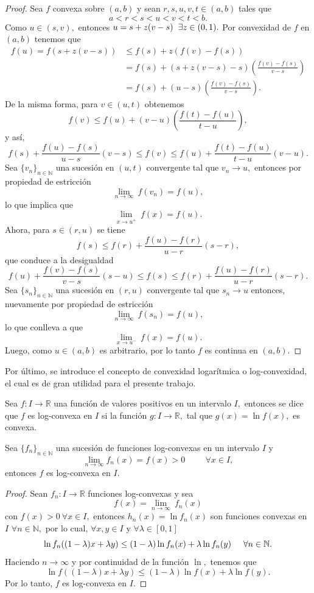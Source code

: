 \begin{proof}
	Sea $f$ convexa sobre $(a,b)$ y sean $r, s, u, v, t \in (a,b)$ tales que $$a < r < s < u < v < t < b.$$ Como $u \in (s,v),$ entonces $u = s+z(v-s)  \hspace{0.2cm} \exists z \in (0,1).$ Por convexidad de $f$ en $(a,b)$ tenemos que
	\begin{align*}
	f(u) = f(s+z(v-s)) &\leq f(s)+z(f(v)-f(s))\\
	&= f(s)+(s+z(v-s)-s)\left(\frac{f(v)-f(s)}{v-s}\right)\\
	&=f(s)+(u-s)\left(\frac{f(v)-f(s)}{v-s}\right).
	\end{align*}
	De la misma forma, para $v \in (u,t)$ obtenemos $$f(v) \leq f(u)+(v-u)\left(\frac{f(t)-f(u)}{t-u}\right),$$ y así, $$f(s)+\frac{f(u)-f(s)}{u-s}(v-s) \leq f(v) \leq f(u)+\frac{f(t)-f(u)}{t-u}(v-u).$$
	Sea $\{v_n\}_{n \in \mathbb{N}}$ una sucesión en $(u,t)$ convergente tal que $v_n \rightarrow u,$ entonces por propiedad de estricción $$\lim_{n \rightarrow \infty}\ f(v_n) = f(u),$$ lo que implica que $$\lim_{x \rightarrow u^+}\ f(x) = f(u).$$ Ahora, para $s \in (r,u)$ se tiene $$f(s) \leq f(r)+\frac{f(u)-f(r)}{u-r}(s-r),$$ que conduce a la desigualdad $$f(u)+\frac{f(v)-f(s)}{v-s}(s-u) \leq f(s) \leq f(r)+\frac{f(u)-f(r)}{u-r}(s-r).$$
	Sea $\{s_n\}_{n \in \mathbb{N}}$ una sucesión en $(r,u)$ convergente tal que $s_n \rightarrow u$ entonces, nuevamente por propiedad de estricción $$\lim_{n \rightarrow \infty}\ f(s_n) = f(u),$$ lo que conlleva a que $$\lim_{x \rightarrow u^-}\ f(x) = f(u).$$ Luego, como $u \in (a,b)$ es arbitrario, por lo tanto $f$ es continua en $(a,b).$
\end{proof}
Por último, se introduce el concepto de convexidad logarítmica o log-convexidad, el cual es de gran utilidad para el presente trabajo.
\begin{definition}
	Sea $f: I \rightarrow \mathbb{R}$ una función de valores positivos en un intervalo $I,$ entonces se dice que $f$ es log-convexa en $I$ si la función $g: I \rightarrow \mathbb{R},$ tal que $g(x) = \ln f(x),$ es convexa.
\end{definition}
\begin{proposition}
	Sea $\{f_n\}_{n \in \mathbb{N}}$ una sucesión de funciones log-convexas en un intervalo $I$ y $$\lim_{n\rightarrow\infty} f_n(x) = f(x) > 0 \hspace{1cm} \forall x \in I,$$ entonces $f$ es log-convexa en $I.$
\end{proposition}
\begin{proof}
	Sean $f_n: I \rightarrow \mathbb{R}$ funciones log-convexas y sea $$f(x) = \lim_{n \rightarrow \infty}\ f_n(x)$$ con $f(x) > 0\ \forall x \in I,$ entonces $h_n(x) = \ln f_n(x)$ son funciones convexas en $I$ $\forall n \in \mathbb{N},$ por lo cual, $\forall x, y \in I$ y $\forall \lambda \in [0,1]$ $$\ln f_n((1-\lambda)x+\lambda y) \leq (1-\lambda)\ln f_n(x)+\lambda \ln f_n(y)\hspace{0.5cm}\forall n \in \mathbb{N}.$$ Haciendo $n \rightarrow \infty$ y por continuidad de la función $\ln,$ tenemos que $$\ln f((1-\lambda)x+\lambda y) \leq (1-\lambda)\ln f(x)+\lambda\ln f(y).$$
	Por lo tanto, $f$ es log-convexa en $I.$
\end{proof}

